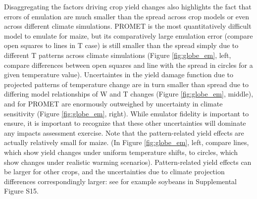 \documentclass[gmd, manuscript]{copernicus} %
\begin{document}

Disaggregating the factors driving crop yield changes also highlights the fact that errors of emulation are much smaller than the spread across crop models or even across different climate simulations.
PROMET is the most quantitatively difficult model to emulate for maize, but its  %
comparatively large emulation error (compare open squares to lines in T case) is still smaller than the spread simply due to different T patterns across climate simulations (Figure \ref{fig:globe_em}, left, compare differences between open squares and line with the spread in circles for a given temperature value). Uncertaintes in the yield damage function due to projected patterns of temperature change are in turn smaller than spread due to differing model relationships of W and T changes (Figure \ref{fig:globe_em}, middle), and for PROMET are enormously outweighed by uncertainty in climate sensitivity (Figure \ref{fig:globe_em}, right). %
While emulator fidelity is important to ensure, it is important to recognize that these other  uncertainties will dominate any impacts assessment exercise.
Note that the pattern-related yield effects are actually relatively small for maize. (In Figure \ref{fig:globe_em}, left, compare lines, which show yield changes under uniform temperature shifts, to circles,  which show changes under realistic warming scenarios). Pattern-related yield effects can be larger for other crops, and the uncertainties due to climate projection differences correspondingly larger: see for example soybeans in Supplemental Figure S15. 
\end{document}
